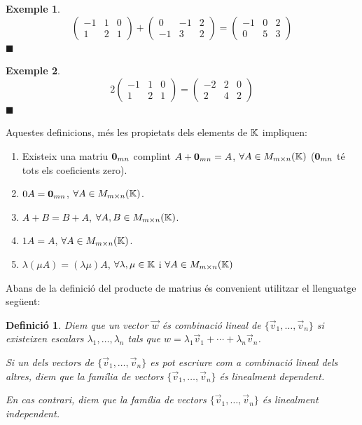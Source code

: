 \documentclass[
  11pt,
]{book}
\numberwithin{dummy}{section}
\theoremstyle{maincolornumbox}
\theoremstyle{blacknumex}
\newtheorem{exampleT}{Exemple}[chapter]
\theoremstyle{blacknumbox}
\newtheorem{definitionT}{Definició}[chapter]
\theoremstyle{maincolornum}
\newenvironment{definition}{\begin{dBox}\begin{definitionT}}{\end{definitionT}\end{dBox}}
\newenvironment{example}{\begin{exampleT}}{\hfill{\tiny\ensuremath{\blacksquare}}\end{exampleT}}
\begin{document}
\begin{example}
\[\begin{pmatrix} -1 & 1 & 0 \\ 1 & 2 & 1 \end{pmatrix} +
    \begin{pmatrix} 0 & -1 & 2 \\ -1 & 3 & 2 \end{pmatrix} =
    \begin{pmatrix} -1 & 0 & 2 \\ 0 & 5 & 3 \end{pmatrix}\]
\end{example}

\begin{example}
\[2 \begin{pmatrix} -1 & 1 & 0 \\ 1 & 2 & 1 \end{pmatrix} =
    \begin{pmatrix} -2 & 2 & 0 \\ 2 & 4 & 2 \end{pmatrix}\]
\end{example}

Aquestes definicions, més les propietats dels elements de \(\mathbb{K}\)
impliquen:

\begin{enumerate}
\def\labelenumi{\arabic{enumi}.}
\item
  Existeix una matriu \(\mathbf{0}_{mn}\) complint \(A+\mathbf{0}_{mn}=A\),
  \(\forall A \in M_{m\times n}(\mathbb{K})\) (\(\mathbf{0}_{mn}\) té tots els coeficients
  zero).
\item
  \(0 A = \mathbf{0}_{mn}\), \(\forall A \in M_{m\times n}(\mathbb{K})\).
\item
  \(A+B=B+A\), \(\forall A,B \in M_{m\times n}(\mathbb{K})\).
\item
  \(1A=A\), \(\forall A \in M_{m\times n}(\mathbb{K})\).
\item
  \(\lambda (\mu A)= (\lambda \mu) A\), \(\forall \lambda,\mu \in \mathbb{K}\) i
  \(\forall A \in M_{m\times n}(\mathbb{K})\)
\end{enumerate}

Abans de la definició del producte de matrius és convenient utilitzar el
llenguatge següent:

\begin{definition}
\protect\hypertarget{def:dependlineal}{}\label{def:dependlineal}Diem que \emph{un vector
\(\vec{w}\) és combinació lineal de \(\{\vec{v}_1,\dots,\vec{v}_n\}\)} si
existeixen escalars \(\lambda_1, \dots , \lambda_n\) tals que
\(w=\lambda_1\vec{v}_1+\cdots+\lambda_n\vec{v}_n\).

Si un dels vectors de \(\{\vec{v}_1,\dots,\vec{v}_n\}\) es pot escriure
com a combinació lineal dels altres, diem que \emph{la família de vectors
\(\{\vec{v}_1,\dots,\vec{v}_n\}\) és linealment dependent}.

En cas contrari, diem que \emph{la família de vectors
\(\{\vec{v}_1,\dots,\vec{v}_n\}\) és linealment independent}.
\end{definition}
\end{document}
